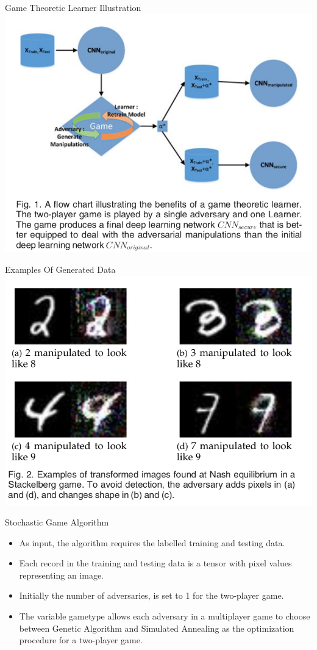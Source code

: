 \documentclass[10pt]{beamer}
\begin{document}
\begin{frame}{Game Theoretic Learner Illustration}
	\includegraphics[scale=0.33]{images/Fig1}
\end{frame}


\begin{frame}{Examples Of Generated Data}
	\includegraphics[scale=0.33]{images/Fig2}
\end{frame}


\begin{frame}{Stochastic Game Algorithm}
	\begin{itemize}
        \item As input, the algorithm requires the labelled training and testing data. 
        \item Each record in the training and testing data is a tensor with pixel values representing an image. 
        \item Initially the number of adversaries, is set to 1 for the two-player game. 
        \item The variable gametype allows each adversary in a multiplayer game to choose between Genetic Algorithm and Simulated Annealing as the optimization procedure for a two-player game.
	\end{itemize}
\end{frame}
\end{document}
